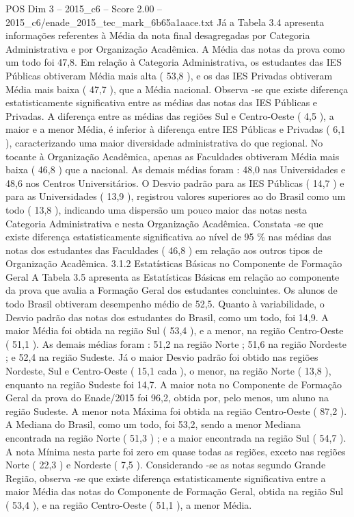 \begin{textsample}{POS Dim 3 – 2015\_c6 – Score 2.00 – 2015\_c6/enade\_2015\_tec\_mark\_6b65a1aace.txt}
Já a Tabela 3.4 apresenta informações referentes à Média da nota final desagregadas por Categoria Administrativa e por Organização Acadêmica.
A Média das notas da prova como um todo foi 47,8.
Em relação à Categoria Administrativa, os estudantes das IES Públicas obtiveram Média mais alta ( 53,8 ), e os das IES Privadas obtiveram Média mais baixa ( 47,7 ), que a Média nacional.
Observa -se que existe diferença estatisticamente significativa entre as médias das notas das IES Públicas e Privadas.
A diferença entre as médias das regiões Sul e Centro-Oeste ( 4,5 ), a maior e a menor Média, é inferior à diferença entre IES Públicas e Privadas ( 6,1 ), caracterizando uma maior diversidade administrativa do que regional.
No tocante à Organização Acadêmica, apenas as Faculdades obtiveram Média mais baixa ( 46,8 ) que a nacional.
As demais médias foram : 48,0 nas Universidades e 48,6 nos Centros Universitários.
O Desvio padrão para as IES Públicas ( 14,7 ) e para as Universidades ( 13,9 ), registrou valores superiores ao do Brasil como um todo ( 13,8 ), indicando uma dispersão um pouco maior das notas nesta Categoria Administrativa e nesta Organização Acadêmica.
Constata -se que existe diferença estatisticamente significativa ao nível de 95 \% nas médias das notas dos estudantes das Faculdades ( 46,8 ) em relação aos outros tipos de Organização Acadêmica. 3.1.2 Estatísticas Básicas no Componente de Formação Geral A Tabela 3.5 apresenta as Estatísticas Básicas em relação ao componente da prova que avalia a Formação Geral dos estudantes concluintes.
Os alunos de todo Brasil obtiveram desempenho médio de 52,5.
Quanto à variabilidade, o Desvio padrão das notas dos estudantes do Brasil, como um todo, foi 14,9.
A maior Média foi obtida na região Sul ( 53,4 ), e a menor, na região Centro-Oeste ( 51,1 ).
As demais médias foram : 51,2 na região Norte ; 51,6 na região Nordeste ; e 52,4 na região Sudeste.
Já o maior Desvio padrão foi obtido nas regiões Nordeste, Sul e Centro-Oeste ( 15,1 cada ), o menor, na região Norte ( 13,8 ), enquanto na região Sudeste foi 14,7.
A maior nota no Componente de Formação Geral da prova do Enade/2015 foi 96,2, obtida por, pelo menos, um aluno na região Sudeste.
A menor nota Máxima foi obtida na região Centro-Oeste ( 87,2 ).
A Mediana do Brasil, como um todo, foi 53,2, sendo a menor Mediana encontrada na região Norte ( 51,3 ) ; e a maior encontrada na região Sul ( 54,7 ).
A nota Mínima nesta parte foi zero em quase todas as regiões, exceto nas regiões Norte ( 22,3 ) e Nordeste ( 7,5 ).
Considerando -se as notas segundo Grande Região, observa -se que existe diferença estatisticamente significativa entre a maior Média das notas do Componente de Formação Geral, obtida na região Sul ( 53,4 ), e na região Centro-Oeste ( 51,1 ), a menor Média.

\end{textsample}
